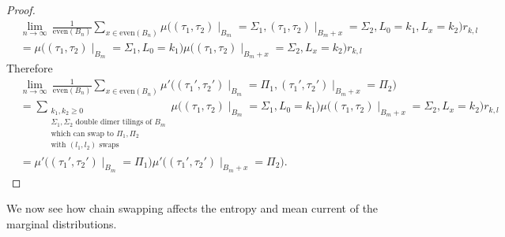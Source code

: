 \documentclass[11pt]{article}
\theoremstyle{remark}
\theoremstyle{definition}
\begin{document}
\begin{proof}
    \begin{align*}
        &\lim_{n\to \infty}\,\frac{1}{\text{even}(B_n)} \sum_{x\in \text{even}(B_n)} \mu\bigg((\tau_1,\tau_2)\mid_{B_m} = \Sigma_1, (\tau_1,\tau_2)\mid_{B_m+x} = \Sigma_2, L_0 = k_1, L_x = k_2\bigg) r_{k,l} \\
        &= \mu\bigg((\tau_1,\tau_2)\mid_{B_m} = \Sigma_1, L_0 = k_1\bigg) \mu \bigg( (\tau_1,\tau_2)\mid_{B_m+x} = \Sigma_2, L_x = k_2\bigg) r_{k,l}
    \end{align*}
    Therefore 
    \begin{align*}
        &\lim_{n\to \infty}\, \frac{1}{\text{even}(B_n)} \sum_{x\in \text{even}(B_n)} \mu'\bigg((\tau_1',\tau_2')\mid_{B_m} = \Pi_1, (\tau_1',\tau_2')\mid_{B_m+x} = \Pi_2\bigg) \\
        &= \!\!\! \sum_{\substack{k_1,k_2 \geq 0 \\ \Sigma_1,\Sigma_2 \text{ double dimer tilings of }B_m\\
        \text{which can swap to $\Pi_1,\Pi_2$}\\\text{with }(l_1,l_2) \text{ swaps}}}  \!\! \mu\bigg((\tau_1,\tau_2)\mid_{B_m} = \Sigma_1, L_0 = k_1\bigg) \mu \bigg( (\tau_1,\tau_2)\mid_{B_m+x} = \Sigma_2, L_x = k_2\bigg) r_{k,l} \\
        &=\mu'\bigg((\tau_1',\tau_2')\mid_{B_m} = \Pi_1\bigg) \mu'\bigg((\tau_1',\tau_2')\mid_{B_m+x} = \Pi_2\bigg).
    \end{align*}
\end{proof}

We now see how chain swapping affects the entropy and mean current of the marginal distributions. 
\end{document}
